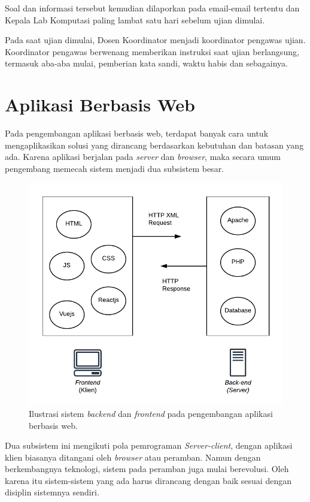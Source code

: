     Soal dan informasi tersebut kemudian dilaporkan pada email-email tertentu
    dan Kepala Lab Komputasi paling lambat satu hari sebelum ujian dimulai.

    Pada saat ujian dimulai, Dosen Koordinator menjadi koordinator pengawas
    ujian. Koordinator pengawas berwenang memberikan instruksi saat ujian
    berlangsung, termasuk aba-aba mulai, pemberian kata sandi, waktu habis dan
    sebagainya.

\section{Aplikasi Berbasis Web}
    Pada pengembangan aplikasi berbasis web, terdapat
    banyak cara untuk mengaplikasikan solusi yang dirancang berdasarkan
    kebutuhan dan batasan yang ada. Karena
    aplikasi berjalan pada \textit{server} dan \textit{browser}, maka
    secara umum pengembang memecah sistem menjadi dua subsistem besar.
    
    \begin{figure}
        \centering
        \includegraphics{Gambar/Illustration - frontend-backend.pdf}
        \caption{Ilustrasi sistem \textit{backend} dan \textit{frontend} pada pengembangan 
            aplikasi berbasis web.}
        \label{fig:illust-web}
    \end{figure}
    
    Dua subsistem ini mengikuti pola pemrograman \textit{Server-client}, dengan
    aplikasi klien biasanya ditangani oleh \textit{browser} atau peramban. Namun
    dengan berkembangnya teknologi, sistem pada peramban juga mulai berevolusi.
    Oleh karena itu sistem-sistem yang ada harus dirancang dengan baik sesuai
    dengan disiplin sistemnya sendiri.
    
